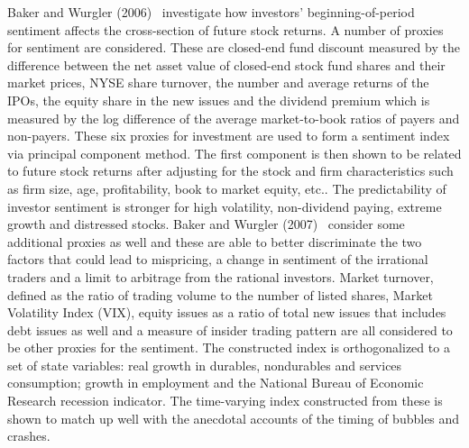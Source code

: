  
 Baker and Wurgler (2006)~\cite{baker2006investor} investigate how investors' beginning-of-period sentiment affects the cross-section of future stock returns. A number of proxies for sentiment are considered. These are closed-end fund discount measured by the difference between the net asset value of closed-end stock fund shares and their market prices, NYSE share turnover, the number and average returns of the IPOs, the equity share in the new issues and the dividend premium which is measured by the log difference of the average market-to-book ratios of payers and non-payers. These six proxies for investment are used to form a sentiment index via principal component method. The first component is then shown to be related to future stock returns after adjusting for the stock and firm characteristics such as firm size, age, profitability, book to market equity, etc.. The predictability of investor sentiment is stronger for high volatility, non-dividend paying, extreme growth and distressed stocks. Baker and Wurgler (2007)~\cite{baker2007investor} consider some additional proxies as well and these are able to better discriminate the two factors that could lead to mispricing, a change in sentiment of the irrational traders and a limit to arbitrage from the rational investors. Market turnover, defined as the ratio of trading volume to the number of listed shares, Market Volatility Index (VIX), equity issues as a ratio of total new issues that includes debt issues as well and a measure of insider trading pattern are all considered to be other proxies for the sentiment. The constructed index is orthogonalized to a set of state variables: real growth in durables, nondurables and services consumption; growth in employment and the National Bureau of Economic Research recession indicator. The time-varying index constructed from these is shown to match up well with the anecdotal accounts of the timing of bubbles and crashes.
 

